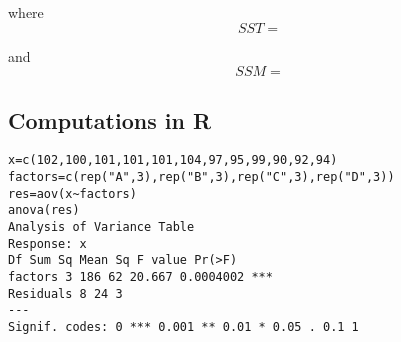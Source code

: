 \documentclass[a4paper,12pt]{article}
\begin{document}
where
\[ SST = \]

and
\[ SSM = \]

\subsection{Computations in R}
\begin{verbatim}
x=c(102,100,101,101,101,104,97,95,99,90,92,94)
factors=c(rep("A",3),rep("B",3),rep("C",3),rep("D",3))
res=aov(x~factors)
anova(res)
Analysis of Variance Table
Response: x
Df Sum Sq Mean Sq F value Pr(>F)
factors 3 186 62 20.667 0.0004002 ***
Residuals 8 24 3
---
Signif. codes: 0 *** 0.001 ** 0.01 * 0.05 . 0.1 1

\end{verbatim}
\end{document}
